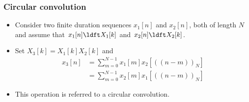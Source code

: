 

\begin{frame}
\frametitle{Circular convolution}
\begin{itemize}
\item Consider two finite duration sequences $x_1[n]$ and $x_2[n]$, both of length $N$ and assume that $x_1[n] \ldft X_1[k]$ and $x_2[n] \ldft X_2[k]$. 
\item Set $X_3[k]= X_1[k]X_2[k]$ and 
\begin{align*}
x_3[n] 
&= \sum_{m=0}^{N-1} x_1[m] x_2[((n-m))_N] \\
&= \sum_{m=0}^{N-1} x_2[m] x_1[((n-m))_N]
\end{align*}
\item This operation is referred to a \alert{circular convolution}.
\end{itemize}
\end{frame}

